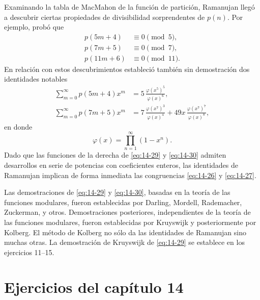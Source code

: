     Examinando la tabla de MacMahon de la función de partición, Ramanujan llegó a descubrir
    ciertas propiedades de divisibilidad sorprendentes de $p(n)$. Por ejemplo, probó que
    \begin{align}
        p(5m+4)&\equiv0\pmod{5},\label{eq:14-26}\\
        p(7m+5)&\equiv0\pmod{7},\label{eq:14-27}\\
        p(11m+6)&\equiv0\pmod{11}.\label{eq:14-28}
    \end{align}
    En relación con estos descubrimientos estableció también sin demostración dos identidades
    notables
    \begin{align}
        \sum_{m=0}^{\infty}p(5m+4)x^m&=5\,\frac{\varphi(x^5)^5}{\varphi(x)^6},\label{eq:14-29}\\
        \sum_{m=0}^{\infty}p(7m+5)x^m&=7\,\frac{\varphi(x^7)^3}{\varphi(x)^4}+49x\,\frac{\varphi(x^7)^7}{\varphi(x)^8},\label{eq:14-30}
    \end{align}
    en donde
    \begin{equation*}
        \varphi(x)=\prod_{n=1}^{\infty}(1-x^n).
    \end{equation*}
    Dado que las funciones de la derecha de \eqref{eq:14-29} y \eqref{eq:14-30} admiten
    desarrollos en serie de potencias con coeficientes enteros, las identidades de Ramanujan
    implican de forma inmediata las congruencias \eqref{eq:14-26} y \eqref{eq:14-27}.

    Las demostraciones de \eqref{eq:14-29} y \eqref{eq:14-30}, basadas en la teoría de las
    funciones modulares, fueron establecidas por Darling, Mordell, Rademacher, Zuckerman, y
    otros. Demostraciones posteriores, independientes de la teoría de las funciones modulares,
    fueron establecidas por Kruyswijk \cite{kruyswijk1950} y posteriormente por Kolberg. El
    método de Kolberg no sólo da las identidades de Ramanujan sino muchas otras. La
    demostración de Kruyswijk de \eqref{eq:14-29} se establece en los ejercicios 11--15.

    \section*{Ejercicios del capítulo 14}

